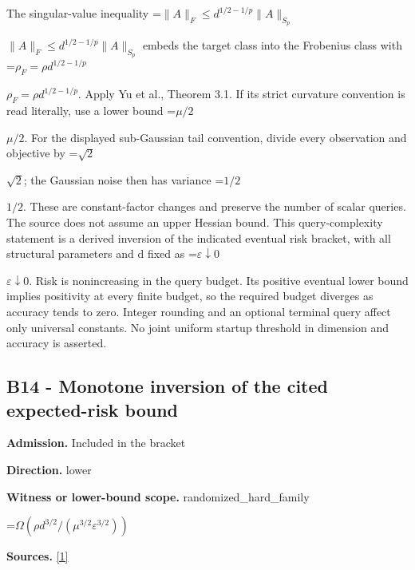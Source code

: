 \documentclass[10pt,a4paper]{article}
\newcommand{\AtlasMath}[1]{\par\begingroup\centering\setbox0=\hbox{$\displaystyle #1$}\ifdim\wd0>1.4\linewidth\typeout{ATLAS WIDE FORMULA: \the\wd0}\fi\ifdim\wd0>\linewidth\resizebox{\linewidth}{!}{\box0}\else\box0\fi\par\endgroup}
\newcommand{\AtlasInlineMath}[1]{\begingroup\setbox0=\hbox{$#1$}\ifdim\wd0>.4\linewidth\endgroup\AtlasMath{#1}\else\endgroup$#1$\fi}
\begin{document}
The singular-value inequality \AtlasInlineMath{\|A\|_F\le d^{1/2-1/p}\|A\|_{S_p}} embeds the target class into the Frobenius class with \AtlasInlineMath{\rho_F=\rho d^{1/2-1/p}}. Apply Yu et al., Theorem 3.1. If its strict curvature convention is read literally, use a lower bound \AtlasInlineMath{\mu/2}. For the displayed sub-Gaussian tail convention, divide every observation and objective by \AtlasInlineMath{\sqrt2}; the Gaussian noise then has variance \AtlasInlineMath{1/2}. These are constant-factor changes and preserve the number of scalar queries. The source does not assume an upper Hessian bound. This query-complexity statement is a derived inversion of the indicated eventual risk bracket, with all structural parameters and d fixed as \AtlasInlineMath{\varepsilon\downarrow0}. Risk is nonincreasing in the query budget. Its positive eventual lower bound implies positivity at every finite budget, so the required budget diverges as accuracy tends to zero. Integer rounding and an optional terminal query affect only universal constants. No joint uniform startup threshold in dimension and accuracy is asserted.



\subsection{B14 - Monotone inversion of the cited expected-risk bound}


\textbf{Admission.} Included in the bracket



\textbf{Direction.} lower



\textbf{Witness or lower-bound scope.} randomized\_hard\_family



\AtlasMath{\Omega(\rho d^{3/2}/(\mu^{3/2}\varepsilon^{3/2}))}


\textbf{Sources.} \href{https://papers.nips.cc/paper_files/paper/2024/file/b444ad72520a5f5c467343be88e352ed-Paper-Conference.pdf}{[1]}
\end{document}
